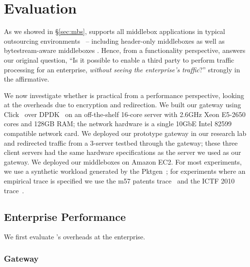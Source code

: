 \section{Evaluation} \label{sec:eval}

As we showed in \S\ref{sec:mbs}, \sys supports all middlebox applications in typical outsourcing environments~\cite{aplomb,etsi-nfv} -- including header-only middleboxes as well as bytestream-aware middleboxes . 
Hence, from a functionality perspective, \sys answers our original question, ``Is it possible to enable a third party to perform traffic processing for an enterprise, {\em without seeing the enterprise's traffic}?''  strongly in the affirmative.

We now investigate whether \sys is practical from a performance perspective, looking at the overheads due to encryption and redirection. 
We built our gateway using Click~\cite{click} over DPDK~\cite{dpdk} on an off-the-shelf 16-core server with 2.6GHz Xeon E5-2650 cores and 128GB RAM; the network hardware is a single 10GbE Intel 82599 compatible network card. 
We deployed our prototype gateway in our research lab and redirected traffic from a 3-server testbed through the gateway; these three client servers had the same hardware specifications as the server we used as our gateway.
We deployed our middleboxes on Amazon EC2.
For most experiments, we use a synthetic workload generated by the Pktgen~\cite{pktgen}; for experiments where an empirical trace is specified we use the m57 patents trace~\cite{m57} and the ICTF 2010 trace~\cite{ictf}.


\subsection{Enterprise Performance}
\label{sec:enterprise}
We first evaluate \sys's overheads at the enterprise. %

\subsubsection{Gateway}

